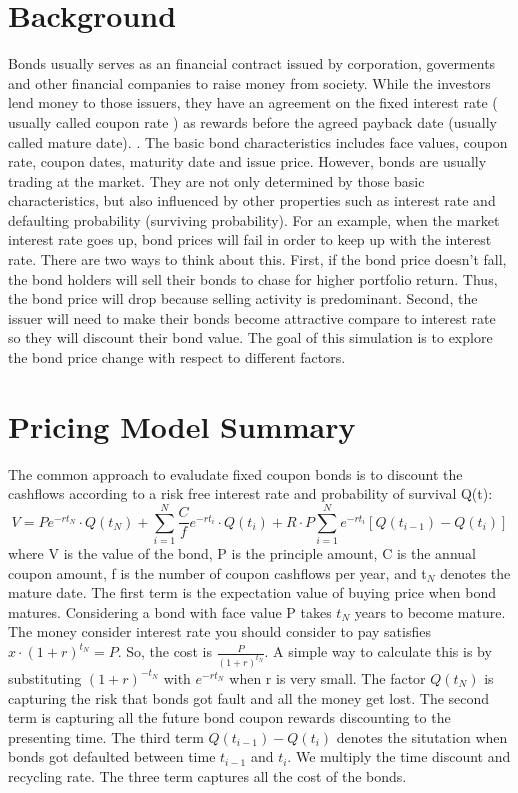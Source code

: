 \documentclass[a4paper,11pt]{article} %
\begin{document}
		\section{Background}
		Bonds usually serves as an financial contract issued by corporation,  goverments and other financial companies to raise money from society. \cite{John88p14, chen22p2316} While the investors lend money to those issuers, they have an agreement on the fixed interest rate ( usually called coupon rate ) as rewards before the agreed payback date (usually called mature date). \cite{eom2004structural, batten2014convertible}. The basic bond characteristics includes face values, coupon  rate, coupon dates, maturity date and issue price. \cite{Jason22} However, bonds are usually trading at the market. They are not only determined by  those basic characteristics, but also influenced by other properties such as interest rate and defaulting probability (surviving probability). \cite{Jason22, deng2015pricing} For an example, when the market interest rate goes up, bond prices will fail in order to keep up with the interest rate.\cite{malkiel1962expectations, marsh1983stochastic} There are two ways to think about this. First, if the bond price doesn't fall, the bond holders will sell their bonds to chase for higher portfolio return. Thus, the bond price will drop because selling activity is predominant. Second, the issuer will need to make their bonds become attractive compare to interest rate so they will discount their bond value. The goal of this simulation is to explore the bond price change with respect to different factors.
		
		\section{Pricing Model Summary}
		The common approach to evaludate fixed coupon bonds is to discount the cashflows according to a risk free interest rate and probability of survival Q(t):
		\begin{equation}
			V = P e^{-rt_{N}} \cdot Q(t_{N}) + \sum_{i=1}^{N}\frac{C}{f} e^{-r t_{i}}\cdot Q(t_{i}) + R\cdot P \sum_{i = 1}^{N} e^{-r t_{i}}[Q(t_{i-1}) - Q(t_{i})]
		\end{equation}
	where V is the value of the bond, P is the principle amount, C is the annual coupon amount, f is the number of coupon cashflows per year, and t$_{N}$ denotes the mature date.
		The first term is the expectation value of buying price when bond matures. Considering a bond with face value P takes $t_{N}$ years to become mature. The money consider interest rate you should consider to pay satisfies $x \cdot (1 + r)^{t_{N}} = P$. So, the cost is $\frac{P}{(1 + r)^{t_{N}}}$. A simple way to calculate this is by substituting $(1 + r)^{-t_{N}}$ with $e^{-rt_{N}}$ when r is very small.\cite{chen22p2316} The factor $Q(t_{N})$ is capturing the risk that bonds got fault and all the money get lost. The second term is capturing all the future bond coupon rewards discounting to the presenting time. The third term $Q(t_{i - 1}) - Q(t_{i})$ denotes the situtation when bonds got defaulted between time $t_{i - 1}$  and $t_{i}$. We multiply the time discount and recycling rate. The three term captures all the cost of the bonds.
		
\end{document}
